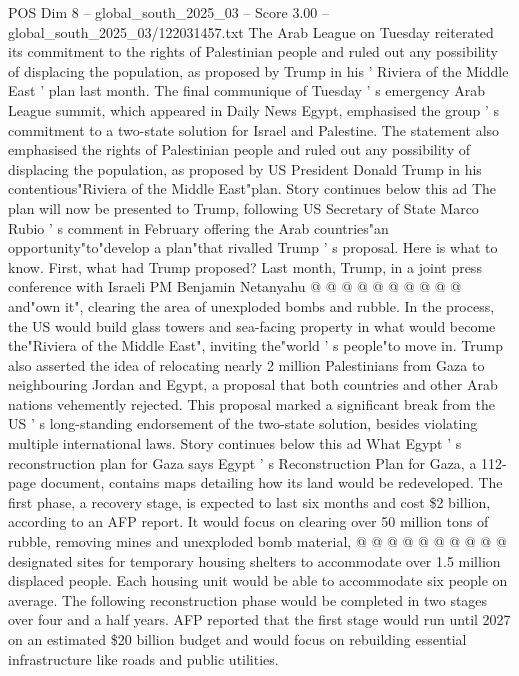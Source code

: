 \begin{textsample}{POS Dim 8 – global\_south\_2025\_03 – Score 3.00 – global\_south\_2025\_03/122031457.txt}  \label{ex:f8_pos_388}
The Arab League on Tuesday reiterated its commitment to the rights of Palestinian people and ruled out any possibility of displacing the population, as proposed by Trump in his ' Riviera of the Middle East ' plan last month.
The final communique of Tuesday ' s emergency Arab League summit, which appeared in Daily News Egypt, emphasised the group ' s commitment to a two-state solution for Israel and Palestine.
The statement also emphasised the rights of Palestinian people and ruled out any possibility of displacing the population, as proposed by US President Donald Trump in his contentious"Riviera of the Middle East"plan.
Story continues below this ad The plan will now be presented to Trump, following US Secretary of State Marco Rubio ' s comment in February offering the Arab countries"an opportunity"to"develop a plan"that rivalled Trump ' s proposal.
Here is what to know.
First, what had Trump proposed?
Last month, Trump, in a joint press conference with Israeli PM Benjamin Netanyahu @ @ @ @ @ @ @ @ @ @ and"own it", clearing the area of unexploded bombs and rubble.
In the process, the US would build glass towers and sea-facing property in what would become the"Riviera of the Middle East", inviting the"world ' s people"to move in.
Trump also asserted the idea of relocating nearly 2 million Palestinians from Gaza to neighbouring Jordan and Egypt, a proposal that both countries and other Arab nations vehemently rejected.
This proposal marked a significant break from the US ' s long-standing endorsement of the two-state solution, besides violating multiple international laws.
Story continues below this ad What Egypt ' s reconstruction plan for Gaza says Egypt ' s Reconstruction Plan for Gaza, a 112-page document, contains maps detailing how its land would be redeveloped.
The first phase, a recovery stage, is expected to last six months and cost \$2 billion, according to an AFP report.
It would focus on clearing over 50 million tons of rubble, removing mines and unexploded bomb material, @ @ @ @ @ @ @ @ @ @ designated sites for temporary housing shelters to accommodate over 1.5 million displaced people.
Each housing unit would be able to accommodate six people on average.
The following reconstruction phase would be completed in two stages over four and a half years.
AFP reported that the first stage would run until 2027 on an estimated \$20 billion budget and would focus on rebuilding essential infrastructure like roads and public utilities.

\end{textsample}
